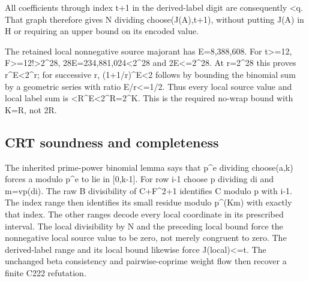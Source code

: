 All coefficients through index t+\allowbreak{}1 in the derived-label digit are consequently \textless{}\allowbreak{}q. That graph therefore gives N dividing choose(J(A),t+\allowbreak{}1), without putting J(A) in H or requiring an upper bound on its encoded value.



The retained local nonnegative source majorant has E=\allowbreak{}8,388,608. For t\textgreater{}\allowbreak{}=\allowbreak{}12, F\textgreater{}\allowbreak{}=\allowbreak{}12!\textgreater{}\allowbreak{}2\textasciicircum{}\allowbreak{}28, 28E=\allowbreak{}234,881,024\textless{}\allowbreak{}2\textasciicircum{}\allowbreak{}28 and 2E\textless{}\allowbreak{}=\allowbreak{}2\textasciicircum{}\allowbreak{}28. At r=\allowbreak{}2\textasciicircum{}\allowbreak{}28 this proves r\textasciicircum{}\allowbreak{}E\textless{}\allowbreak{}2\textasciicircum{}\allowbreak{}r; for successive r, (1+\allowbreak{}1/\allowbreak{}r)\textasciicircum{}\allowbreak{}E\textless{}\allowbreak{}2 follows by bounding the binomial sum by a geometric series with ratio E/\allowbreak{}r\textless{}\allowbreak{}=\allowbreak{}1/\allowbreak{}2. Thus every local source value and local label sum is \textless{}\allowbreak{}R\textasciicircum{}\allowbreak{}E\textless{}\allowbreak{}2\textasciicircum{}\allowbreak{}R=\allowbreak{}2\textasciicircum{}\allowbreak{}K. This is the required no-wrap bound with K=\allowbreak{}R, not 2R.



\subsection{CRT soundness and completeness}



The inherited prime-power binomial lemma says that p\textasciicircum{}\allowbreak{}e dividing choose(a,k) forces a modulo p\textasciicircum{}\allowbreak{}e to lie in [0,k-1]. For row i-1 choose p dividing di and m=\allowbreak{}vp(di). The raw B divisibility of C+\allowbreak{}F\textasciicircum{}\allowbreak{}2+\allowbreak{}1 identifies C modulo p with i-1. The index range then identifies its small residue modulo p\textasciicircum{}\allowbreak{}(Km) with exactly that index. The other ranges decode every local coordinate in its prescribed interval. The local divisibility by N and the preceding local bound force the nonnegative local source value to be zero, not merely congruent to zero. The derived-label range and its local bound likewise force J(local)\textless{}\allowbreak{}=\allowbreak{}t. The unchanged beta consistency and pairwise-coprime weight flow then recover a finite C222 refutation.



